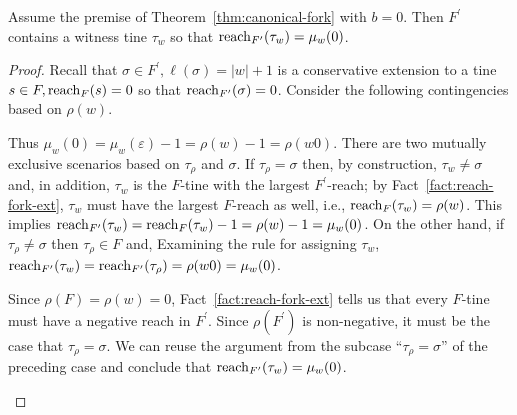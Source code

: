 	\begin{proposition}\label{prop:optadv-tau-mu-w}
		Assume the premise of Theorem~\ref{thm:canonical-fork} with $b = 0$.
		Then $F^\prime$ contains a witness tine $\tau_w$ 
		so that 
		$\operatorname{reach}_{F^\prime}(\tau_w) = \mu_w(0)$. 
	\end{proposition}
	\begin{proof}
		Recall that $\sigma \in F^\prime, \ell(\sigma) = |w| + 1$ 
		is a conservative extension to 
		a tine $s \in F, \operatorname{reach}_F(s) = 0$ 
		so that $\operatorname{reach}_{F^\prime}(\sigma) = 0$. 
		Consider the following contingencies based on $\rho(w)$.

		\begin{description}[font=\normalfont\itshape\space]
			\item[If $\rho(w) > 0$.]
				Thus $\mu_w(0) = \mu_w(\varepsilon) - 1 = \rho(w) - 1 = \rho(w0)$.
				There are two mutually exclusive scenarios 
				based on $\tau_\rho$ and $\sigma$.
				If $\tau_\rho = \sigma$ then, by construction, 
				$\tau_w \neq \sigma$ and, in addition, 
				$\tau_w$ is the $F$-tine with the largest $F^\prime$-reach; 
				by Fact~\ref{fact:reach-fork-ext}, 
				$\tau_w$ must have the largest $F$-reach as well, i.e.,	
				$\operatorname{reach}_{F}(\tau_w) = \rho(w)$. 
				This implies 
				$\operatorname{reach}_{F^\prime}(\tau_w) = \operatorname{reach}_{F}(\tau_w) - 1 = \rho(w) - 1 = \mu_w(0)$. 
				On the other hand, if $\tau_\rho \neq \sigma$ then $\tau_\rho \in F$ and, 
				Examining the rule for assigning $\tau_w$, 
				$\operatorname{reach}_{F^\prime}(\tau_w) = \operatorname{reach}_{F^\prime}(\tau_\rho) = \rho(w0) = \mu_w(0)$. 

			\item[If $\rho(w) = 0$.]
				Since $\rho(F) = \rho(w) = 0$, 
				Fact~\ref{fact:reach-fork-ext} tells us that 
				every $F$-tine must have a negative reach in $F^\prime$. 
				Since $\rho(F^\prime)$ is non-negative, 
				it must be the case that $\tau_\rho = \sigma$. 
				We can reuse the argument from the subcase ``$\tau_\rho = \sigma$'' of the preceding case and conclude that $\operatorname{reach}_{F^\prime}(\tau_w) = \mu_w(0)$.
		\end{description}
	\end{proof}



